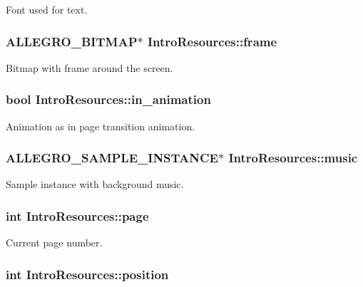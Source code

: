 Font used for text. \hypertarget{structIntroResources_a3e273e0582d30a5876d0781ac5cbb442}{
\subsubsection[{frame}]{\setlength{\rightskip}{0pt plus 5cm}A\+L\+L\+E\+G\+R\+O\+\_\+\+B\+I\+T\+M\+A\+P$\ast$ Intro\+Resources\+::frame}}\label{structIntroResources_a3e273e0582d30a5876d0781ac5cbb442}
Bitmap with frame around the screen. \hypertarget{structIntroResources_a31425a1c19b09305c68326521c05eb15}{
\subsubsection[{in\+\_\+animation}]{\setlength{\rightskip}{0pt plus 5cm}bool Intro\+Resources\+::in\+\_\+animation}}\label{structIntroResources_a31425a1c19b09305c68326521c05eb15}
Animation as in page transition animation. \hypertarget{structIntroResources_ab91be04f8060a65a24eb3e574c577940}{
\subsubsection[{music}]{\setlength{\rightskip}{0pt plus 5cm}A\+L\+L\+E\+G\+R\+O\+\_\+\+S\+A\+M\+P\+L\+E\+\_\+\+I\+N\+S\+T\+A\+N\+C\+E$\ast$ Intro\+Resources\+::music}}\label{structIntroResources_ab91be04f8060a65a24eb3e574c577940}
Sample instance with background music. \hypertarget{structIntroResources_af4fa351c1a12e6932fa3bcfd938e68f4}{
\subsubsection[{page}]{\setlength{\rightskip}{0pt plus 5cm}int Intro\+Resources\+::page}}\label{structIntroResources_af4fa351c1a12e6932fa3bcfd938e68f4}
Current page number. \hypertarget{structIntroResources_ad7318e5baf83663178b3a3f71874d304}{
\subsubsection[{position}]{\setlength{\rightskip}{0pt plus 5cm}int Intro\+Resources\+::position}}\label{structIntroResources_ad7318e5baf83663178b3a3f71874d304}
